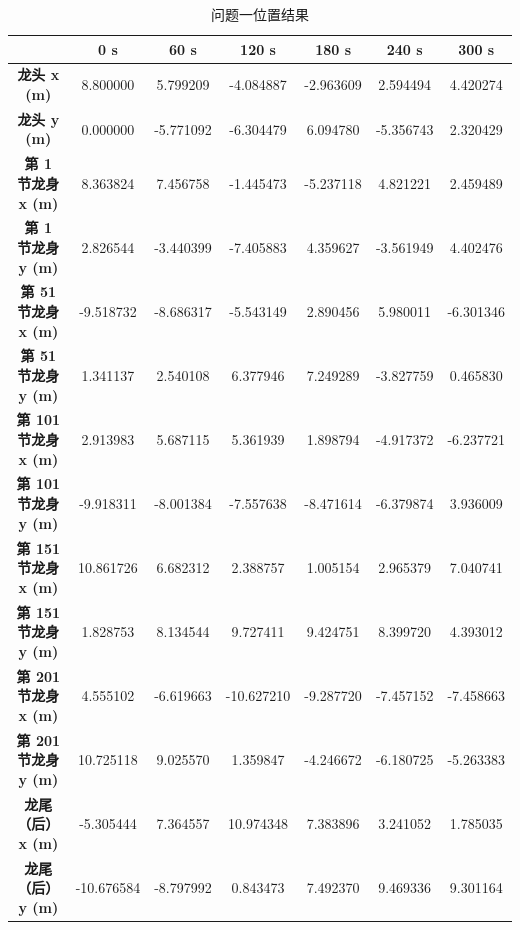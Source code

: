 \documentclass[withoutpreface,bwprint]{cumcmthesis}
\begin{document}
\begin{table}[!ht]
    \centering
    \begin{tabular}{|c|c|c|c|c|c|c|}
    \hline
        \textbf{} & \textbf{0 s} & \textbf{60 s} & \textbf{120 s} & \textbf{180 s} & \textbf{240 s} & \textbf{300 s } \\ \hline
        \textbf{龙头 x (m)} & 8.800000  & 5.799209  & -4.084887  & -2.963609  & 2.594494  & 4.420274   \\ \hline
        \textbf{龙头 y (m)} & 0.000000  & -5.771092  & -6.304479  & 6.094780  & -5.356743  & 2.320429   \\ \hline
        \textbf{第 1 节龙身 x (m)} & 8.363824  & 7.456758  & -1.445473  & -5.237118  & 4.821221  & 2.459489   \\ \hline
        \textbf{第 1 节龙身 y (m)} & 2.826544  & -3.440399  & -7.405883  & 4.359627  & -3.561949  & 4.402476   \\ \hline
        \textbf{第 51 节龙身 x (m)} & -9.518732  & -8.686317  & -5.543149  & 2.890456  & 5.980011  & -6.301346   \\ \hline
        \textbf{第 51 节龙身 y (m)} & 1.341137  & 2.540108  & 6.377946  & 7.249289  & -3.827759  & 0.465830   \\ \hline
        \textbf{第 101 节龙身 x (m)} & 2.913983  & 5.687115  & 5.361939  & 1.898794  & -4.917372  & -6.237721   \\ \hline
        \textbf{第 101 节龙身 y (m)} & -9.918311  & -8.001384  & -7.557638  & -8.471614  & -6.379874  & 3.936009   \\ \hline
        \textbf{第 151 节龙身 x (m)} & 10.861726  & 6.682312  & 2.388757  & 1.005154  & 2.965379  & 7.040741   \\ \hline
        \textbf{第 151 节龙身 y (m)} & 1.828753  & 8.134544  & 9.727411  & 9.424751  & 8.399720  & 4.393012   \\ \hline
        \textbf{第 201 节龙身 x (m)} & 4.555102  & -6.619663  & -10.627210  & -9.287720  & -7.457152  & -7.458663   \\ \hline
        \textbf{第 201 节龙身 y (m)} & 10.725118  & 9.025570  & 1.359847  & -4.246672  & -6.180725  & -5.263383   \\ \hline
        \textbf{龙尾（后）x (m)} & -5.305444  & 7.364557  & 10.974348  & 7.383896  & 3.241052  & 1.785035   \\ \hline
        \textbf{龙尾（后）y (m)} & -10.676584  & -8.797992  & 0.843473  & 7.492370  & 9.469336  & 9.301164   \\ \hline
    \end{tabular}
    \caption{问题一位置结果}
    \label{问题一位置结果}
\end{table}
\end{document}
